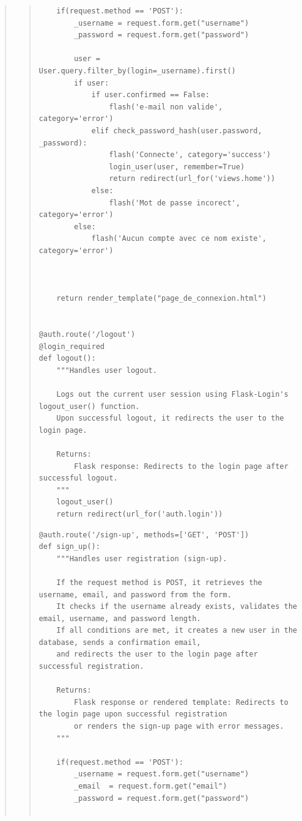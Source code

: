\documentclass{article}
\begin{document}
\begin{quote}
\begin{quote}
\begin{tcolorbox}[colback=grisClair,colframe=black]
\begin{lstlisting}
    if(request.method == 'POST'):
        _username = request.form.get("username")
        _password = request.form.get("password")

        user = User.query.filter_by(login=_username).first()
        if user:
            if user.confirmed == False:
                flash('e-mail non valide', category='error')
            elif check_password_hash(user.password, _password):
                flash('Connecte', category='success')
                login_user(user, remember=True)
                return redirect(url_for('views.home'))
            else:
                flash('Mot de passe incorect', category='error')
        else:
            flash('Aucun compte avec ce nom existe', category='error')

 

    return render_template("page_de_connexion.html")


@auth.route('/logout')
@login_required
def logout():
    """Handles user logout.

    Logs out the current user session using Flask-Login's logout_user() function.
    Upon successful logout, it redirects the user to the login page.

    Returns:
        Flask response: Redirects to the login page after successful logout.
    """
    logout_user()
    return redirect(url_for('auth.login'))

            \end{lstlisting}       
        \end{tcolorbox}
        \begin{tcolorbox}[colback=grisClair,colframe=black]
            \begin{lstlisting}
@auth.route('/sign-up', methods=['GET', 'POST'])
def sign_up():
    """Handles user registration (sign-up).

    If the request method is POST, it retrieves the username, email, and password from the form.
    It checks if the username already exists, validates the email, username, and password length.
    If all conditions are met, it creates a new user in the database, sends a confirmation email,
    and redirects the user to the login page after successful registration.

    Returns:
        Flask response or rendered template: Redirects to the login page upon successful registration
        or renders the sign-up page with error messages.
    """

    if(request.method == 'POST'):
        _username = request.form.get("username")
        _email  = request.form.get("email")
        _password = request.form.get("password")


\end{lstlisting}
\end{tcolorbox}
\end{quote}
\end{quote}
\end{document}
